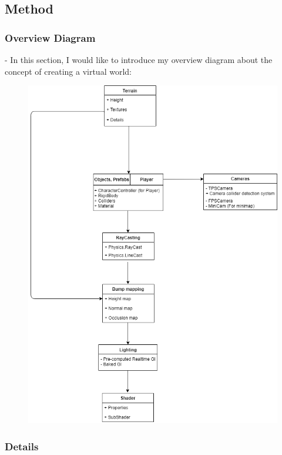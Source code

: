 \documentclass[a4paper, 13pt]{extarticle}
\begin{document}
 		 \subsection{Method}  
 		 \subsubsection{Overview Diagram}
 		 - In this section, I would like to introduce my overview diagram about the concept of creating a virtual world: \par
 		 
 		 	\begin{figure}[h]
 		 		\centering
 		 		\includegraphics[width=0.59\columnwidth]{Overview_diagram.png}
 		 		\label{fig:Overview1}
 		 	\end{figure}
 		 
 		 
 		 \newpage
 		  \subsubsection{Details}
\end{document}
